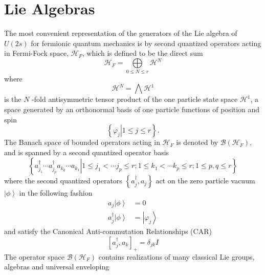 \documentclass[aps,preprint]{revtex4}%
\begin{document}
\section{Lie Algebras\label{liealg}}

The most convenient representation of the generators of the Lie algebra of
$U(2s)$ for fermionic quantum mechanics is by second quantized operators
acting in Fermi-Fock space, $\mathcal{H}_{F}$, which is defined to be the
direct sum
\begin{equation}
\mathcal{H}_{F}=%
{\textstyle\bigoplus\limits_{0\leq N\leq r}}
\mathcal{H}^{N}%
\end{equation}
where
\begin{equation}
\mathcal{H}^{N}=%
{\textstyle\bigwedge}
\mathcal{H}^{1}%
\end{equation}
is the $N$ -fold antisymmetric tensor product of the one particle state space
$\mathcal{H}^{1}$, a space generated by an orthonormal basis of one particle
functions of position and spin
\begin{equation}
\left\{  \left.  \varphi_{j}\right\vert 1\leq j\leq r\right\}  .
\end{equation}
The Banach space \cite{Encyclo} of bounded operators acting in $\mathcal{H}%
_{F}$ is denoted by $\mathcal{B}\left(  \mathcal{H}_{F}\right)  ,$ and is
spanned by a second quantized operator basis
\begin{equation}
\left\{  \left.  a_{j_{1}}^{\dagger}\cdots a_{j_{p}}^{\dagger}a_{k_{q}}\cdots
a_{k_{1}}\right\vert 1\leq j_{1}<\cdots j_{p}\leq r;1\leq k_{1}<\cdots
k_{p}\leq r;1\leq p,q\leq r\right\}
\end{equation}
where the second quantized operators $\left\{  a_{j}^{\dagger},a_{j}\right\}
$ act on the zero particle vacuum $\left\vert \phi\right\rangle $ in the
following fashion%
\begin{align}
a_{j}\left\vert \phi\right\rangle  &  =0\nonumber\\
a_{j}^{\dagger}\left\vert \phi\right\rangle  &  =\left\vert \varphi
_{j}\right\rangle
\end{align}
and satisfy the Canonical Anti-commutation Relationships (CAR)
\begin{equation}
\left[  a_{j}^{\dagger},a_{k}\right]  _{+}=\delta_{jk}I
\end{equation}
The operator space $\mathcal{B}\left(  \mathcal{H}_{F}\right)  $ contains
realizations of many classical Lie groups, algebras and universal enveloping
\end{document}
